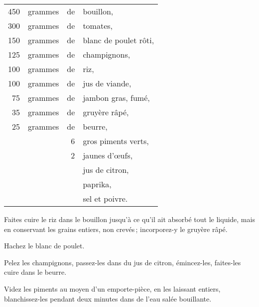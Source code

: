 \footnotesize
\begin{longtable}{rrrp{16em}}
    450 & grammes & de & bouillon,                                                                        \\
    300 & grammes & de & tomates,                                                                         \\
    150 & grammes & de & blanc de poulet rôti,                                                            \\
    125 & grammes & de & champignons,                                                                     \\
    100 & grammes & de & riz,                                                                             \\
    100 & grammes & de & jus de viande,                                                                   \\
     75 & grammes & de & jambon gras, fumé,                                                               \\
     35 & grammes & de & gruyère râpé,                                                                    \\
     25 & grammes & de & beurre,                                                                          \\
        &         &  6 & gros piments verts,                                                              \\
        &         &  2 & jaunes d'œufs,                                                                   \\
        &         &    & jus de citron,                                                                   \\
        &         &    & paprika,                                                                         \\
        &         &    & sel et poivre.
\end{longtable}
\normalsize

Faites cuire le riz dans le bouillon jusqu'à ce qu'il ait absorbé tout le
liquide, mais en conservant les grains entiers, non crevés ; incorporez-y le
gruyère râpé.

Hachez le blanc de poulet.

Pelez les champignons, passez-les dans du jus de citron, émincez-les, faites-les
cuire dans le beurre.

Videz les piments au moyen d'un emporte-pièce, en les laissant entiers,
blanchissez-les pendant deux minutes dans de l'eau salée bouillante.

